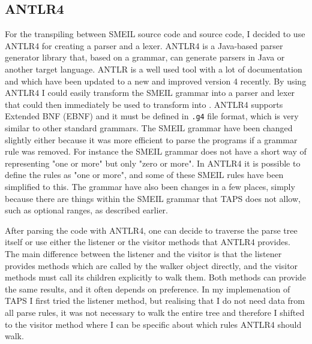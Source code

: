 \subsection{ANTLR4}
For the transpiling between SMEIL source code and \cspm{} source code, I decided to use ANTLR4 for creating a parser and a lexer. ANTLR4 is a Java-based parser generator library that, based on a grammar, can generate parsers in Java or another target language. ANTLR is a well used tool with a lot of documentation and which have been updated to a new and improved version 4 recently. By using ANTLR4 I could easily transform the SMEIL grammar into a parser and lexer that could then immediately be used to transform into \cspm{}.
ANTLR4 supports Extended BNF (EBNF) and it must be defined in \texttt{.g4} file format, which is very similar to other standard grammars. The SMEIL grammar have been changed slightly either because it was more efficient to parse the programs if a grammar rule was removed. For instance the SMEIL grammar does not have a short way of representing "one or more" but only "zero or more". In ANTLR4 it is possible to define the rules as "one or more", and some of these SMEIL rules have been simplified to this. The grammar have also been changes in a few places, simply because there are things within the SMEIL grammar that TAPS does not allow, such as optional ranges, as described earlier.

%

After parsing the code with ANTLR4, one can decide to traverse the parse tree itself or use either the listener or the visitor methods that ANTLR4 provides. The main difference between the listener and the visitor is that the listener provides methods which are called by the walker object directly, and the visitor methods must call its children explicitly to walk them. Both methods can provide the same results, and it often depends on preference. In my implemenation of TAPS I first tried the listener method, but realising that I do not need data from all parse rules, it was not necessary to walk the entire tree and therefore I shifted to the visitor method where I can be specific about which rules ANTLR4 should walk.

